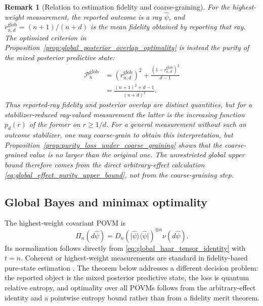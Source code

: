 \documentclass[journal]{IEEEtran}
\newtheorem{remark}[theorem]{Remark}
\newcommand{\ket}[1]{\lvert #1\rangle}
\newcommand{\bra}[1]{\langle #1\rvert}
\begin{document}
\begin{remark}[Relation to estimation fidelity and coarse-graining]
\label{rem:global_overlap_fidelity_and_coarse_graining}
For the highest-weight measurement, the reported outcome is a ray
\(\widehat\psi\), and
\(
 r_{n,d}^{\mathrm{glob}}=(n+1)/(n+d)
\)
is the mean fidelity obtained by reporting that ray.  The optimized criterion
in Proposition~\ref{prop:global_posterior_overlap_optimality} is instead the
purity of the mixed posterior predictive state:
\begin{equation}
\begin{split}
    \mathcal P_n^{\mathrm{glob}}
    &=
    \left(r_{n,d}^{\mathrm{glob}}\right)^2
    +\frac{\left(1-r_{n,d}^{\mathrm{glob}}\right)^2}{d-1}\\
    &=
    \frac{(n+1)^2+d-1}{(n+d)^2}.
\end{split}
\label{eq:global_overlap_value_as_fidelity_function}
\end{equation}
Thus reported-ray fidelity and posterior overlap are distinct quantities, but
for a stabilizer-reduced ray-valued measurement the latter is the increasing
function \(p_d(r)\) of the former on \(r\ge1/d\).  For a general measurement
without such an outcome stabilizer, one may coarse-grain to obtain this
interpretation, but
Proposition~\ref{prop:purity_loss_under_coarse_graining} shows that the
coarse-grained value is no larger than the original one.  The unrestricted
global upper bound therefore comes from the direct arbitrary-effect calculation
\eqref{eq:global_effect_purity_upper_bound}, not from the coarse-graining step.
\end{remark}

\subsection{Global Bayes and minimax optimality}
\label{subsec:global_bayes_minimax_optimality}

The highest-weight covariant POVM is
\begin{equation}
    \Pi_n(d\hat\psi)
    =
    D_n
    (\ket{\hat\psi}\bra{\hat\psi})^{\otimes n}
    \nu(d\hat\psi).
    \label{eq:highest_weight_collective_povm}
\end{equation}
Its normalization follows directly from
\eqref{eq:global_haar_tensor_identity} with \(t=n\).  Coherent or
highest-weight measurements are standard in fidelity-based pure-state
estimation
\cite{MassarPopescu1995OptimalEstimation,DerkaBuzekEkert1998OptimalEstimation,Hayashi1998PureStateEstimation,Group2}.
The theorem below addresses a different decision problem: the reported object
is the mixed posterior predictive state, the loss is quantum relative entropy,
and optimality over all POVMs follows from the arbitrary-effect identity and a
pointwise entropy bound rather than from a fidelity merit theorem.
\end{document}
